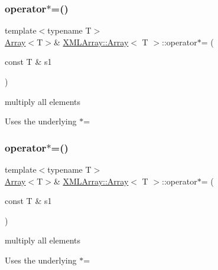 \subsubsection{\texorpdfstring{operator$\ast$=()}{operator*=()}\hspace{0.1cm}{\footnotesize\ttfamily [4/6]}}
{\footnotesize\ttfamily template$<$typename T$>$ \\
\mbox{\hyperlink{classXMLArray_1_1Array}{Array}}$<$T$>$\& \mbox{\hyperlink{classXMLArray_1_1Array}{X\+M\+L\+Array\+::\+Array}}$<$ T $>$\+::operator$\ast$= (\begin{DoxyParamCaption}\item[{const T \&}]{s1 }\end{DoxyParamCaption})\hspace{0.3cm}{\ttfamily [inline]}}



multiply all elements 

Uses the underlying $\ast$= \mbox{\label{classXMLArray_1_1Array_a4afa4c469f84b40f88c27273602528cc}} 
\subsubsection{\texorpdfstring{operator$\ast$=()}{operator*=()}\hspace{0.1cm}{\footnotesize\ttfamily [5/6]}}
{\footnotesize\ttfamily template$<$typename T$>$ \\
\mbox{\hyperlink{classXMLArray_1_1Array}{Array}}$<$T$>$\& \mbox{\hyperlink{classXMLArray_1_1Array}{X\+M\+L\+Array\+::\+Array}}$<$ T $>$\+::operator$\ast$= (\begin{DoxyParamCaption}\item[{const T \&}]{s1 }\end{DoxyParamCaption})\hspace{0.3cm}{\ttfamily [inline]}}



multiply all elements 

Uses the underlying $\ast$= \mbox{\label{classXMLArray_1_1Array_a4afa4c469f84b40f88c27273602528cc}} 
